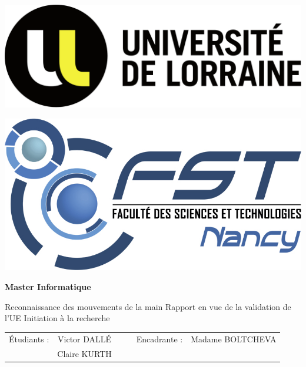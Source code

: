 \documentclass[11pt]{article}
\begin{document}
\begin{titlepage}
    \begin{center}

        \begin{minipage}[b]{0.3\textwidth}
        \includegraphics[width=\textwidth]{images/Logo_Universite_de_Lorraine.png}
        \end{minipage}
        \begin{minipage}[b]{0.2\textwidth}
            \centering
            \includegraphics[width=\textwidth]{images/logo-fst-format-jpg-couleur.jpg}
        \end{minipage}
        \smallbreak
        \vspace{0.5cm}
        \textbf{\large Master Informatique}

        \vfill
        {\Large Reconnaissance des mouvements de la main} \smallbreak
        Rapport \smallbreak en vue de la validation de l'UE Initiation à la recherche \smallbreak
        \vfill
        \begin{tabular}{ccc|ccc}
            \'Etudiants : & Victor DALL\'E & & & Encadrante : & Madame BOLTCHEVA \\
            & Claire KURTH & & & & 
            
        \end{tabular}
    \end{center}

\end{titlepage}
\end{document}
